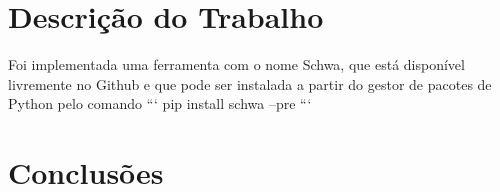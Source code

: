 \documentclass[9pt,a4paper]{extarticle}
\begin{document}
\begin{multicols}{2}
\section{Descrição do Trabalho}\label{sec:work}
Foi implementada uma ferramenta com o nome Schwa, que está disponível livremente
no Github e que pode ser instalada a partir do gestor de pacotes de Python pelo
comando
```
pip install schwa --pre
```


\section{Conclusões}\label{sec:conclui}



\end{multicols}
\end{document}
